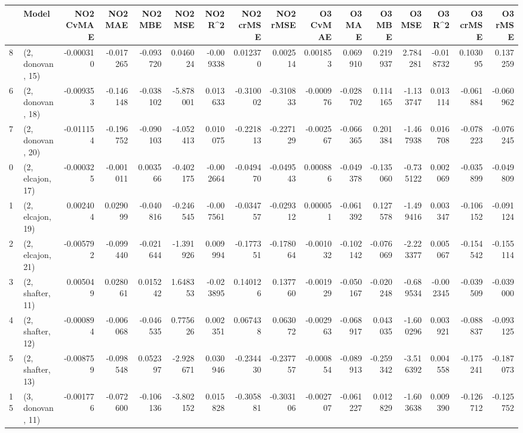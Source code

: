 \begin{tabular}{llrrrrrrrrrrrrrr}
\toprule
{} &             Model &  NO2 CvMAE &   NO2 MAE &   NO2 MBE &    NO2 MSE &   NO2 R\textasciicircum2 &  NO2 crMSE &  NO2 rMSE &  O3 CvMAE &    O3 MAE &    O3 MBE &     O3 MSE &    O3 R\textasciicircum2 &  O3 crMSE &   O3 rMSE \\
\midrule
8  &  (2, donovan, 15) &  -0.000310 & -0.017265 & -0.093720 &   0.046024 & -0.009338 &   0.012370 &  0.002514 &  0.001853 &  0.069910 &  0.219937 &   2.784281 & -0.018732 &  0.103095 &  0.137259 \\
6  &  (2, donovan, 18) &  -0.009353 & -0.146148 & -0.038102 &  -5.878001 &  0.013633 &  -0.310002 & -0.310833 & -0.000976 & -0.028702 &  0.114165 &  -1.133747 &  0.013114 & -0.061884 & -0.060962 \\
7  &  (2, donovan, 20) &  -0.011154 & -0.196752 & -0.090103 &  -4.052413 &  0.010075 &  -0.221813 & -0.227129 & -0.002567 & -0.066365 &  0.201384 &  -1.467938 &  0.016708 & -0.078223 & -0.076245 \\
0  &  (2, elcajon, 17) &  -0.000325 & -0.001011 &  0.003566 &  -0.402175 & -0.002664 &  -0.049470 & -0.049543 &  0.000886 & -0.049378 & -0.135060 &  -0.735122 &  0.002069 & -0.035899 & -0.049809 \\
1  &  (2, elcajon, 19) &   0.002404 &  0.029099 & -0.040816 &  -0.246545 & -0.007561 &  -0.034757 & -0.029312 &  0.000051 & -0.061392 &  0.127578 &  -1.499416 &  0.003347 & -0.106152 & -0.091124 \\
2  &  (2, elcajon, 21) &  -0.005792 & -0.099440 & -0.021644 &  -1.391926 &  0.009994 &  -0.177351 & -0.178064 & -0.001032 & -0.102142 & -0.076069 &  -2.223377 &  0.005067 & -0.154542 & -0.155114 \\
3  &  (2, shafter, 11) &   0.005049 &  0.028061 &  0.015242 &   1.648353 & -0.023895 &   0.140126 &  0.137760 & -0.001929 & -0.050167 & -0.020248 &  -0.689534 & -0.002345 & -0.039509 & -0.039000 \\
4  &  (2, shafter, 12) &  -0.000894 & -0.006068 & -0.046535 &   0.775626 &  0.002351 &   0.067438 &  0.063072 & -0.002963 & -0.068917 &  0.043035 &  -1.600296 &  0.003921 & -0.088837 & -0.093125 \\
5  &  (2, shafter, 13) &  -0.008759 & -0.098548 &  0.052397 &  -2.928671 &  0.030946 &  -0.234430 & -0.237757 & -0.000854 & -0.089913 & -0.259342 &  -3.516392 &  0.004558 & -0.175241 & -0.187073 \\
15 &  (3, donovan, 11) &  -0.001776 & -0.072600 & -0.106136 &  -3.802152 &  0.015828 &  -0.305881 & -0.303106 & -0.002707 & -0.061227 &  0.012829 &  -1.603638 &  0.009390 & -0.126712 & -0.125752 \\

\end{tabular}
